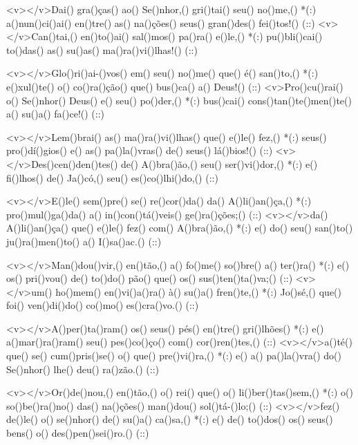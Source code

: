 <v></v>Dai() gra()ças() ao() Se()nhor,() gri()tai() seu() no()me,() *(:)
a()nun()ci()ai() en()tre() as() na()ções() seus() gran()des() fei()tos!() (::)
<v></v>Can()tai,() en()to()ai() sal()mos() pa()ra() e()le,() *(:)
pu()bli()cai() to()das() as() su()as() ma()ra()vi()lhas!() (::)

<v></v>Glo()ri()ai-()vos() em() seu() no()me() que() é() san()to,() *(:)
e()xul()te() o() co()ra()ção() que() bus()ca() a() Deus!() (::)
<v>Pro()cu()rai() o() Se()nhor() Deus() e() seu() po()der,() *(:)
bus()cai() cons()tan()te()men()te() a() su()a() fa()ce!() (::)

<v></v>Lem()brai() as() ma()ra()vi()lhas() que() e()le() fez,() *(:)
seus() pro()dí()gios() e() as() pa()la()vras() de() seus() lá()bios!() (::)
<v></v>Des()cen()den()tes() de() A()bra()ão,() seu() ser()vi()dor,() *(:)
e() fi()lhos() de() Ja()có,() seu() es()co()lhi()do,() (::)

<v></v>E()le() sem()pre() se() re()cor()da() da() A()li()an()ça,() *(:)
pro()mul()ga()da() a() in()con()tá()veis() ge()ra()ções;() (::)
<v></v>da() A()li()an()ça() que() e()le() fez() com() A()bra()ão,() *(:)
e() do() seu() san()to() ju()ra()men()to() a() I()sa()ac.() (::)



<v></v>Man()dou()vir,() en()tão,() a() fo()me() so()bre() a() ter()ra() *(:)
e() os() pri()vou() de() to()do() pão() que() os() sus()ten()ta()va;() (::)
<v></v>um() ho()mem() en()vi()a()ra() à() su()a() fren()te,() *(:)
Jo()sé,() que() foi() ven()di()do() co()mo() es()cra()vo.() (::)

<v></v>A()per()ta()ram() os() seus() pés() en()tre() gri()lhões() *(:)
e() a()mar()ra()ram() seu() pes()co()ço() com() cor()ren()tes,() (::)
<v></v>a()té() que() se() cum()pris()se() o() que() pre()vi()ra,() *(:)
e() a() pa()la()vra() do() Se()nhor() lhe() deu() ra()zão.() (::)

<v></v>Or()de()nou,() en()tão,() o() rei() que() o() li()ber()tas()sem,() *(:)
o() so()be()ra()no() das() na()ções() man()dou() sol()tá-()lo;() (::)
<v></v>fez() de()le() o() se()nhor() de() su()a() ca()sa,() *(:)
e() de() to()dos() os() seus() bens() o() des()pen()sei()ro.() (::)